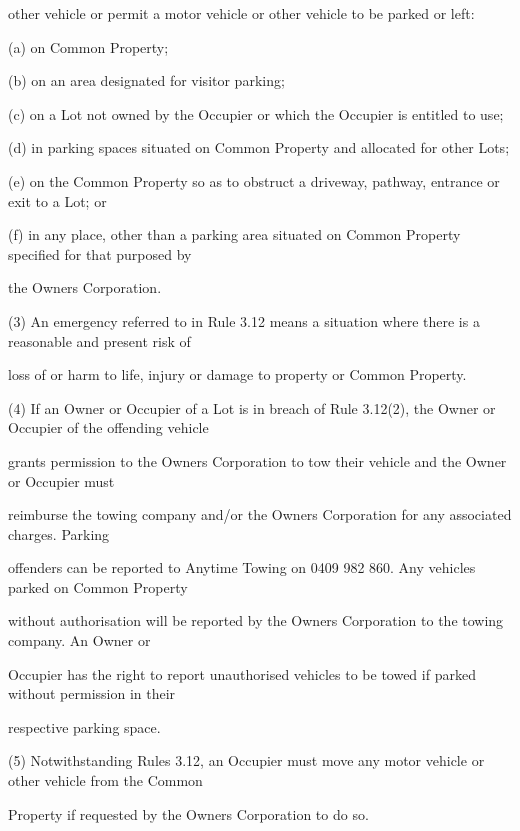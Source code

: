 \documentclass{article}
\begin{document}
{\fontsize{10.02}{1}other vehicle or permit a motor vehicle or other vehicle to be parked or left: }

{\fontsize{9.962}{1}(a) on Common Property; }

{\fontsize{9.962}{1}(b) on an area designated for visitor parking; }

{\fontsize{9.962}{1}(c) on a Lot not owned by the Occupier or which the Occupier is entitled to use; }

{\fontsize{9.962}{1}(d) in parking spaces situated on Common Property and allocated for other Lots; }

{\fontsize{9.962}{1}(e) on the Common Property so as to obstruct a driveway, pathway, entrance or exit to a Lot; or }

{\fontsize{9.962}{1}(f) in any place, other than a parking area situated on Common Property specified for that purposed by }

{\fontsize{10.02}{1}the Owners Corporation. }

{\fontsize{9.962}{1}(3) An emergency referred to in Rule 3.12 means a situation where there is a reasonable and present risk of }

{\fontsize{10.02}{1}loss of or harm to life, injury or damage to property or Common Property. }

{\fontsize{9.962}{1}(4) If an Owner or Occupier of a Lot is in breach of Rule 3.12(2), the Owner or Occupier of the offending vehicle }

{\fontsize{10.02}{1}grants permission to the Owners Corporation to tow their vehicle and the Owner or Occupier must }

{\fontsize{10.02}{1}reimburse the towing company and/or the Owners Corporation for any associated charges. Parking }

{\fontsize{10.02}{1}offenders can be reported to Anytime Towing on 0409 982 860. Any vehicles parked on Common Property }

{\fontsize{10.02}{1}without authorisation will be reported by the Owners Corporation to the towing company. An Owner or }

{\fontsize{10.02}{1}Occupier has the right to report unauthorised vehicles to be towed if parked without permission in their }

{\fontsize{10.02}{1}respective parking space. }

{\fontsize{9.962}{1}(5) Notwithstanding Rules 3.12, an Occupier must move any motor vehicle or other vehicle from the Common }

{\fontsize{10.02}{1}Property if requested by the Owners Corporation to do so. }
\end{document}
